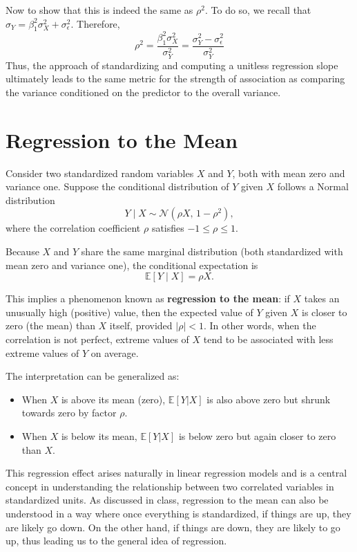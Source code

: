 Now to show that this is indeed the same as $\rho^2$. To do so, we recall that $\sigma_Y = \beta_1^2\sigma_X^2 + \sigma_{\epsilon}^2$. Therefore, 
\begin{equation}
\rho^2 = \frac{\beta_1^2 \sigma_X^2}{\sigma_Y^2} =  \frac{\sigma_Y^2 -\sigma_{\epsilon}^2 }{\sigma_Y^2}
\end{equation}
Thus, the approach of standardizing and computing a unitless regression slope ultimately leads to the same metric for the strength of association as comparing the variance conditioned on the predictor to the overall variance. 


\section{Regression to the Mean}

Consider two standardized random variables $X$ and $Y$, both with mean zero and variance one. Suppose the conditional distribution of $Y$ given $X$ follows a Normal distribution
\[
Y \mid X \sim \mathcal{N}(\rho X, \, 1 - \rho^2),
\]
where the correlation coefficient $\rho$ satisfies $-1 \leq \rho \leq 1$.

Because $X$ and $Y$ share the same marginal distribution (both standardized with mean zero and variance one), the conditional expectation is
\[
\mathbb{E}[Y \mid X] = \rho X.
\]

This implies a phenomenon known as \textbf{regression to the mean}: if $X$ takes an unusually high (positive) value, then the expected value of $Y$ given $X$ is closer to zero (the mean) than $X$ itself, provided $|\rho| < 1$. In other words, when the correlation is not perfect, extreme values of $X$ tend to be associated with less extreme values of $Y$ on average.

The interpretation can be generalized as:
\begin{itemize}
    \item When $X$ is above its mean (zero), $\mathbb{E}[Y|X]$ is also above zero but shrunk towards zero by factor $\rho$.
    \item When $X$ is below its mean, $\mathbb{E}[Y|X]$ is below zero but again closer to zero than $X$.
\end{itemize}

This regression effect arises naturally in linear regression models and is a central concept in understanding the relationship between two correlated variables in standardized units. As discussed in class, regression to the mean can also be understood in a way where once everything is standardized, if things are up, they are likely go down. On the other hand, if things are down, they are likely to go up, thus leading us to the general idea of regression.


